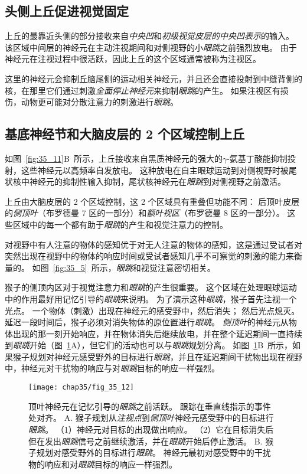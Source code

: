 \subsection{头侧上丘促进视觉固定}

上丘的最靠近头侧的部分接收来自\textit{中央凹}和\textit{初级视觉皮层的中央凹表示}的输入。
该区域中间层的神经元在主动注视期间和对侧视野的小\textit{眼跳}之前强烈放电。
由于神经元在注视过程中很活跃，因此上丘的这个区域通常被称为注视区。


这里的神经元会抑制丘脑尾侧的运动相关神经元，并且还会直接投射到中缝背侧的核，在那里它们通过刺激\textit{全面停止神经元}来抑制\textit{眼跳}的产生。
如果注视区有损伤，动物更可能对分散注意力的刺激进行\textit{眼跳}。


\subsection{基底神经节和大脑皮层的 2 个区域控制上丘}

如图~\ref{fig:35_11}B~所示，上丘接收来自黑质神经元的强大的$\gamma$-氨基丁酸能抑制投射，这些神经元以高频率自发放电。
这种放电在自主眼球运动到对侧视野时被尾状核中神经元的抑制性输入抑制，尾状核神经元在\textit{眼跳}到对侧视野之前激活。


上丘由大脑皮层的 2 个区域控制，这 2 个区域具有重叠但功能不同：
后顶叶皮层的\textit{侧顶叶}（布罗德曼 7 区的一部分）和\textit{额叶视区}（布罗德曼 8 区的一部分）。 
这些区域中的每一个都有助于\textit{眼跳}的产生和视觉注意力的控制。


对视野中有人注意的物体的感知优于对无人注意的物体的感知，这是通过受试者对突然出现在视野中的物体的响应时间或受试者感知几乎不可察觉的刺激的能力来衡量的。
如图~\ref{fig:35_5}~所示，\textit{眼跳}和视觉注意密切相关。


猴子的侧顶内区对于视觉注意力和\textit{眼跳}的产生很重要。
这个区域在处理眼球运动中的作用最好用记忆引导的\textit{眼跳}来说明。
为了演示这种\textit{眼跳}，猴子首先注视一个光点。
一个物体（刺激）出现在神经元的感受野中，然后消失；
然后光点熄灭。
延迟一段时间后，猴子必须对消失物体的原位置进行\textit{眼跳}。
\textit{侧顶叶}的神经元从物体出现的那一刻开始响应，并在物体消失后继续放电，并在整个延迟期间一直持续到\textit{眼跳}开始（图~\ref{fig:35_12}A），但它们的活动也可以与\textit{眼跳}规划分离。
如图~\ref{fig:35_12}B~所示，如果猴子规划对神经元感受野外的目标进行\textit{眼跳}，并且在延迟期间干扰物出现在视野中，神经元对干扰物的响应与对\textit{眼跳}目标的响应一样强烈。


\begin{figure}[htbp]
	\centering
	\texttt{[image: chap35/fig\_35\_12]}
	\caption{顶叶神经元在记忆引导的\textit{眼跳}之前活跃。
		跟踪在垂直线指示的事件处对齐\cite{powell2000response}。
		A. 猴子规划从\textit{注视点}到\textit{侧顶叶}神经元感受野中的目标进行\textit{眼跳}。
		（1）神经元对目标的出现做出响应。
		（2）它在目标消失后但在发出\textit{眼跳}信号之前继续激活，并在\textit{眼跳}开始后停止激活。
		B. 猴子规划对感受野外的目标进行\textit{眼跳}。
		神经元最初对感受野中的干扰物的响应和对\textit{眼跳}目标的响应一样强烈。}
	\label{fig:35_12}
\end{figure}



